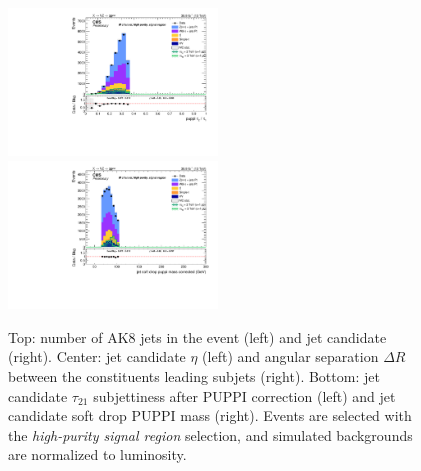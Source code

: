 \begin{figure}[!htb]
\begin{center}
    \includegraphics[width=0.495\textwidth]{plots/v9_U/XVZnnhpSR/FatJet1_puppiTau21.pdf}
    \includegraphics[width=0.495\textwidth]{plots/v9_U/XVZnnhpSR/FatJet1_softdropPuppiMassCorr.pdf}

    \caption{Top: number of AK8 jets in the event (left) and \V jet candidate \pt (right). Center: \V jet candidate $\eta$ (left) and angular separation $\Delta R$ between the constituents leading subjets (right). Bottom: \V jet candidate $\tau_{21}$ subjettiness after PUPPI correction (left) and \V jet candidate soft drop PUPPI mass (right). Events are selected with the \emph{high-purity signal region} selection, and simulated backgrounds are normalized to luminosity.}
  \end{center}
\end{figure}

\clearpage

